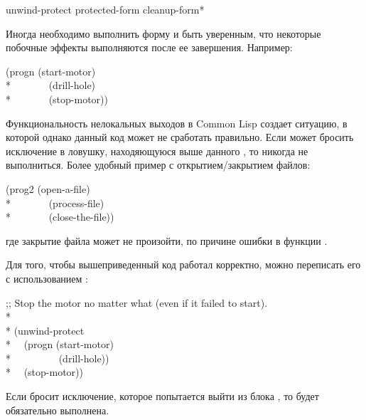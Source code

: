\begin{defspec}
unwind-protect protected-form {cleanup-form}*

Иногда необходимо выполнить форму и быть уверенным, что некоторые побочные
эффекты выполняются после ее завершения.
Например:
\begin{lisp}
(progn (start-motor) \\*
~~~~~~~(drill-hole) \\*
~~~~~~~(stop-motor))
\end{lisp}
Функциональность нелокальных выходов в Common Lisp создает ситуацию, в которой
однако данный код может не сработать правильно.
Если  может бросить исключение в ловушку, находяющуюся выше
данного , то  никогда не выполниться.
Более удобный пример с открытием/закрытием файлов:
\begin{lisp}
(prog2 (open-a-file) \\*
~~~~~~~(process-file) \\*
~~~~~~~(close-the-file))
\end{lisp}
где закрытие файла может не произойти, по причине ошибки в функции
.

Для того, чтобы вышеприведенный код работал корректно, можно переписать его с
использованием :
\begin{lisp}
;; Stop the motor no matter what (even if it failed to start). \\*
\\*
(unwind-protect \\*
~~(progn (start-motor) \\*
~~~~~~~~~(drill-hole)) \\*
~~(stop-motor))
\end{lisp}
Если  бросит исключение, которое попытается выйти из блока
, то  будет обязательно выполнена.


\end{defspec}
